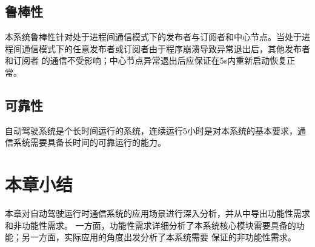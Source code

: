\subsection{鲁棒性}
本系统鲁棒性针对处于进程间通信模式下的发布者与订阅者和中心节点。当处于进程间通信模式下的任意发布者或订阅者由于程序崩溃导致异常退出后，其他发布者和订阅者
的通信不受影响；中心节点异常退出后应保证在5s内重新启动恢复正常。

\subsection{可靠性}
自动驾驶系统是个长时间运行的系统，连续运行5小时是对本系统的基本要求，通信系统需要具备长时间的可靠运行的能力。

\section{本章小结}
本章对自动驾驶运行时通信系统的应用场景进行深入分析，并从中导出功能性需求和非功能性需求。
一方面，功能性需求详细分析了本系统核心模块需要具备的功能；另一方面，实际应用的角度出发分析了本系统需要
保证的非功能性需求。








